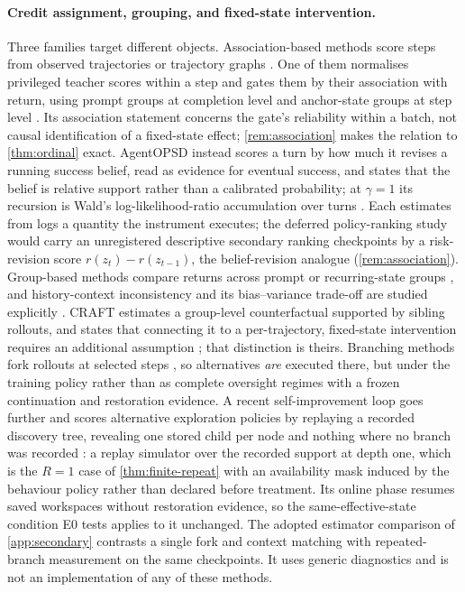 \paragraph{Credit assignment, grouping, and fixed-state intervention.}
Three families target different objects.  Association-based methods score
steps from observed trajectories or trajectory graphs \citep{g2po2026,salt2026}.
One of them normalises privileged teacher scores within a step and gates them
by their association with return, using prompt groups at completion level and
anchor-state groups at step level \citep{adrs2026}.  Its association statement
concerns the gate's reliability within a batch, not causal identification of a
fixed-state effect; \cref{rem:association} makes the relation to
\cref{thm:ordinal} exact.  AgentOPSD instead scores a turn by how much it
revises a running success belief, read as evidence for eventual success, and
states that the belief is relative support rather than a calibrated
probability; at $\gamma=1$ its recursion is Wald's log-likelihood-ratio
accumulation over turns \citep{agentopsd2026}.  Each estimates from logs a
quantity the instrument executes; the deferred policy-ranking study would carry
an unregistered descriptive secondary ranking checkpoints by a risk-revision score
$r(z_t)-r(z_{t-1})$, the belief-revision analogue (\cref{rem:association}).
Group-based methods compare returns across prompt or
recurring-state groups \citep{gigpo2025}, and history-context inconsistency and
its bias--variance trade-off are studied explicitly \citep{hgpo2026}.  CRAFT
estimates a group-level counterfactual supported by sibling rollouts, and states
that connecting it to a per-trajectory, fixed-state intervention requires an
additional assumption \citep[Sec.~3.1]{craft2026}; that distinction is theirs.
Branching methods fork rollouts at selected steps
\citep{arpo2025,treerl2025,at2po2026}, so alternatives \emph{are} executed
there, but under the training policy rather than as complete oversight regimes
with a frozen continuation and restoration evidence.  A recent self-improvement
loop goes further and scores alternative exploration policies by replaying a
recorded discovery tree, revealing one stored child per node and nothing where
no branch was recorded \citep{dreamrsi2026}: a replay simulator over the recorded
support at depth one, which is the $R=1$ case of \cref{thm:finite-repeat} with an
availability mask induced by the behaviour policy rather than declared before
treatment.  Its online phase resumes saved workspaces without restoration
evidence, so the same-effective-state condition E0 tests applies to it
unchanged.  The adopted estimator
comparison of \cref{app:secondary} contrasts a single fork and context matching
with repeated-branch measurement on the same checkpoints.  It uses generic
diagnostics and is not an implementation of any of these methods.


